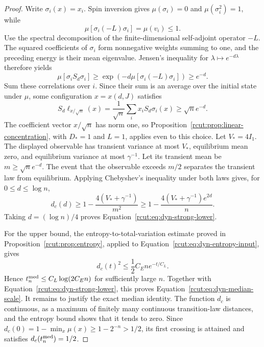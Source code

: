 \begin{proof}
Write $\sigma_i(x)=x_i$.  Spin inversion gives
$\mu(\sigma_i)=0$ and $\mu(\sigma_i^2)=1$, while
\[
 \mu\!\left[\sigma_i(-L)\sigma_i\right]=\mu(v_i)\le1.
\]
Use the spectral decomposition of the finite-dimensional
self-adjoint operator $-L$.  The squared coefficients of $\sigma_i$
form nonnegative weights summing to one, and the preceding energy is
their mean eigenvalue.  Jensen's inequality for $\lambda\mapsto
e^{-d\lambda}$ therefore yields
\begin{equation}
 \mu\!\left[\sigma_i S_d\sigma_i\right]
 \ge\exp\!\left(-d\mu[\sigma_i(-L)\sigma_i]\right)
 \ge e^{-d}.
 \label{rcut:eq:dyn-spin-correlation}
\end{equation}
Sum these correlations over $i$.  Since their sum is an average over
the initial state under $\mu$, some configuration $x=x(d,J)$ satisfies
\[
 S_d\ell_{x/\sqrt n}(x)
 =\frac1{\sqrt n}\sum_i x_i S_d\sigma_i(x)
 \ge\sqrt n e^{-d}.
\]
The coefficient vector $x/\sqrt n$ has norm one, so
Proposition~\ref{rcut:prop:linear-concentration}, with $D_*=1$ and $L=1$,
applies even to this choice.  Let $V_*=4I_1$.  The displayed
observable has transient variance at most $V_*$, equilibrium mean
zero, and equilibrium variance at most $\gamma^{-1}$.
Let its transient mean be $m\ge\sqrt n e^{-d}$.  The event that the
observable exceeds $m/2$ separates the transient law from equilibrium.
Applying Chebyshev's inequality under both laws gives, for
$0\le d\le\log n$,
\[
 d_c(d)\ge1-\frac{4(V_*+\gamma^{-1})}{m^2}
 \ge1-\frac{4(V_*+\gamma^{-1})e^{2d}}{n}.
\]
Taking $d=(\log n)/4$ proves Equation~\eqref{rcut:eq:dyn-strong-lower}.

For the upper bound, the entropy-to-total-variation estimate proved in
Proposition~\ref{rcut:prop:entropy}, applied to
Equation~\eqref{rcut:eq:dyn-entropy-input}, gives
\[
 d_c(t)^2\le\frac12 C_E n e^{-t/C_L}.
\]
Hence
$t_n^{\rm med}\le C_L\log(2C_E n)$ for sufficiently large $n$.
Together with Equation~\eqref{rcut:eq:dyn-strong-lower}, this proves
Equation~\eqref{rcut:eq:dyn-median-scale}.
It remains to justify the exact median identity.  The function $d_c$
is continuous, as a maximum of finitely many continuous transition-law
distances, and the entropy bound shows that it tends to zero.  Since
$d_c(0)=1-\min_x\mu(x)\ge1-2^{-n}>1/2$, its first crossing is
attained and satisfies $d_c(t_n^{\rm med})=1/2$.
\end{proof}

